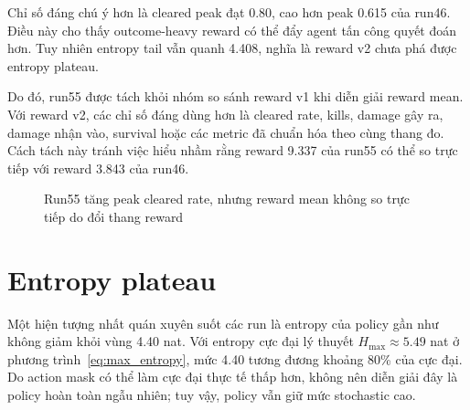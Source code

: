Chỉ số đáng chú ý hơn là cleared peak đạt 0.80, cao hơn peak 0.615 của run46. Điều này cho thấy outcome-heavy reward có thể đẩy agent tấn công quyết đoán hơn. Tuy nhiên entropy tail vẫn quanh 4.408, nghĩa là reward v2 chưa phá được entropy plateau.

Do đó, run55 được tách khỏi nhóm so sánh reward v1 khi diễn giải reward mean. Với reward v2, các chỉ số đáng dùng hơn là cleared rate, kills, damage gây ra, damage nhận vào, survival hoặc các metric đã chuẩn hóa theo cùng thang đo. Cách tách này tránh việc hiểu nhầm rằng reward 9.337 của run55 có thể so trực tiếp với reward 3.843 của run46.

\begin{figure}[H]
    \centering
    \caption{Run55 tăng peak cleared rate, nhưng reward mean không so trực tiếp do đổi thang reward}
    \label{fig:reward_v2_clear_peak}
\end{figure}

\section{Entropy plateau}

Một hiện tượng nhất quán xuyên suốt các run là entropy của policy gần như không giảm khỏi vùng 4.40 nat. Với entropy cực đại lý thuyết $H_{\max}\approx 5.49$ nat ở phương trình~\ref{eq:max_entropy}, mức 4.40 tương đương khoảng 80\% của cực đại. Do action mask có thể làm cực đại thực tế thấp hơn, không nên diễn giải đây là policy hoàn toàn ngẫu nhiên; tuy vậy, policy vẫn giữ mức stochastic cao.

